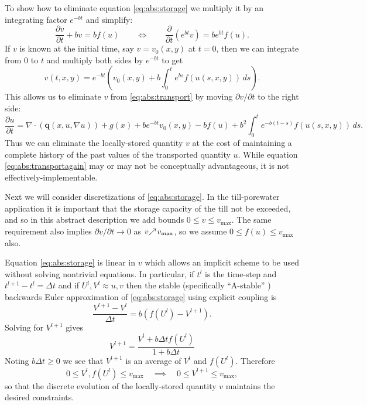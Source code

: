 \documentclass[11pt,final]{amsart}
\newcommand{\Div}{\nabla\cdot}
\newcommand{\grad}{\nabla}
\begin{document}
To show how to eliminate equation \eqref{eq:abs:storage} we multiply it by an integrating factor $e^{-bt}$ and simplify:
    $$\frac{\partial v}{\partial t} + b v = b f(u) \qquad \iff \qquad \frac{\partial}{\partial t} \left(e^{bt} v\right) = b e^{bt} f(u).$$
If $v$ is known at the initial time, say $v=v_0(x,y)$ at $t=0$, then we can integrate from $0$ to $t$ and multiply both sides by $e^{-bt}$ to get
    $$v(t,x,y) = e^{-bt} \left(v_0(x,y) + b \int_0^t e^{bs} f(u(s,x,y))\,ds\right).$$
This allows us to eliminate $v$ from \eqref{eq:abs:transport} by moving $\partial v/\partial t$ to the right side:
\begin{equation}
\frac{\partial u}{\partial t} = \Div \left(\mathbf{q}(x,u,\grad u)\right) + g(x) + b e^{-bt} v_0(x,y) - b f(u) + b^2 \int_0^t e^{-b(t-s)} f(u(s,x,y))\,ds. \label{eq:abs:transportagain} 
\end{equation}
Thus we can eliminate the locally-stored quantity $v$ at the cost of maintaining a complete history of the past values of the transported quantity $u$.  While equation \eqref{eq:abs:transportagain} may or may not be conceptually advantageous, it is not effectively-implementable.

Next we will consider discretizations of \eqref{eq:abs:storage}.  In the till-porewater application it is important that the storage capacity of the till not be exceeded, and so in this abstract description we add bounds $0 \le v \le v_{\text{max}}$.  The same requirement also implies $\partial v/\partial t \to 0$ as $v \!\!\nearrow\! v_{\text{max}}$, so we assume $0 \le f(u) \le v_{\text{max}}$ also.

Equation \eqref{eq:abs:storage} is linear in $v$ which allows an implicit scheme to be used without solving nontrivial equations.  In particular, if $t^l$ is the time-step and $t^{l+1}-t^l = \Delta t$ and if $U^l,V^l \approx u,v$ then the stable (specifically ``A-stable'' \citep{AscherPetzold}) backwards Euler approximation of \eqref{eq:abs:storage} using explicit coupling is
    $$\frac{V^{l+1} - V^l}{\Delta t} = b \left(f(U^l) - V^{l+1}\right).$$
Solving for $V^{l+1}$ gives
\begin{equation}
V^{l+1} = \frac{V^l + b \Delta t f(U^l)}{1 + b \Delta t}
\end{equation}
Noting $b \Delta t \ge 0$ we see that $V^{l+1}$ is an average of $V^l$ and $f(U^l)$.  Therefore
    $$0 \le V^l, f(U^l) \le v_{\text{max}} \quad \implies \quad 0 \le V^{l+1} \le v_{\text{max}},$$
so that the discrete evolution of the locally-stored quantity $v$ maintains the desired constraints.
\end{document}
